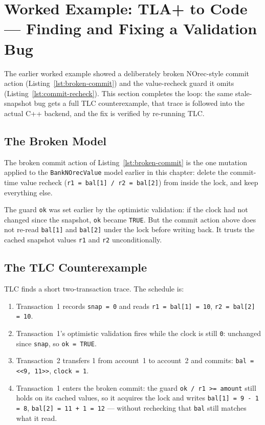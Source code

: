 \section{Worked Example: TLA+ to Code --- Finding and Fixing a Validation Bug}
\label{sec:tla-to-code}

The earlier worked example showed a deliberately broken NOrec-style commit
action (Listing~\ref{lst:broken-commit}) and the value-recheck guard it
omits (Listing~\ref{lst:commit-recheck}).  This section completes the loop:
the same stale-snapshot bug gets a full TLC counterexample, that trace is
followed into the actual C++ backend, and the fix is verified by re-running
TLC.

\subsection{The Broken Model}

The broken commit action of Listing~\ref{lst:broken-commit} is the one
mutation applied to the \texttt{BankNOrecValue} model earlier in this
chapter: delete the commit-time value recheck
(\texttt{r1 = bal[1] /\ r2 = bal[2]}) from inside the lock, and keep
everything else.

The guard \texttt{ok} was set earlier by the optimistic validation:
if the clock had not changed since the snapshot, \texttt{ok} became
\texttt{TRUE}.  But the commit action above does not re-read
\texttt{bal[1]} and \texttt{bal[2]} under the lock before writing back.
It trusts the cached snapshot values \texttt{r1} and \texttt{r2}
unconditionally.

\subsection{The TLC Counterexample}

TLC finds a short two-transaction trace.  The schedule is:

\begin{enumerate}
  \item Transaction~1 records \texttt{snap = 0} and reads
        \texttt{r1 = bal[1] = 10}, \texttt{r2 = bal[2] = 10}.
  \item Transaction~1's optimistic validation fires while the clock is
        still \texttt{0}: unchanged since \texttt{snap}, so
        \texttt{ok = TRUE}.
  \item Transaction~2 transfers 1 from account~1 to account~2 and
        commits: \texttt{bal = <<9, 11>>}, \texttt{clock = 1}.
  \item Transaction~1 enters the broken commit: the guard
        \texttt{ok /\ r1 >= amount} still holds on its cached values, so
        it acquires the lock and writes \texttt{bal[1] = 9 - 1 = 8},
        \texttt{bal[2] = 11 + 1 = 12} --- without rechecking that
        \texttt{bal} still matches what it read.
\end{enumerate}

